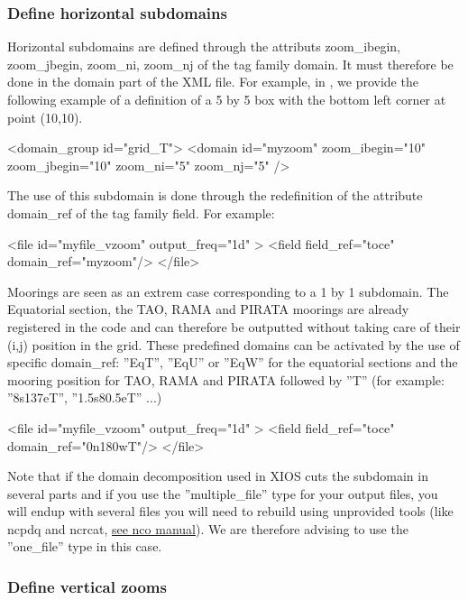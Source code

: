 \documentclass[../main/NEMO_manual]{subfiles}
\begin{document}
\subsubsection{Define horizontal subdomains}

Horizontal subdomains are defined through the attributs zoom\_ibegin, zoom\_jbegin, zoom\_ni, zoom\_nj of
the tag family domain.
It must therefore be done in the domain part of the XML file. 
For example, in , we provide the following example of a definition of 
a 5 by 5 box with the bottom left corner at point (10,10).

\begin{xmllines}
<domain_group id="grid_T">
	<domain id="myzoom" zoom_ibegin="10" zoom_jbegin="10" zoom_ni="5" zoom_nj="5" />
\end{xmllines}

The use of this subdomain is done through the redefinition of the attribute domain\_ref of the tag family field.
For example:

\begin{xmllines}
<file id="myfile_vzoom" output_freq="1d" >
	<field field_ref="toce" domain_ref="myzoom"/>
</file>
\end{xmllines}

Moorings are seen as an extrem case corresponding to a 1 by 1 subdomain. 
The Equatorial section, the TAO, RAMA and PIRATA moorings are already registered in the code and
can therefore be outputted without taking care of their (i,j) position in the grid.
These predefined domains can be activated by the use of specific domain\_ref:
''EqT'', ''EqU'' or ''EqW'' for the equatorial sections and
the mooring position for TAO, RAMA and PIRATA followed by ''T'' (for example: ''8s137eT'', ''1.5s80.5eT'' ...)

\begin{xmllines}
<file id="myfile_vzoom" output_freq="1d" >
	<field field_ref="toce" domain_ref="0n180wT"/>
</file>
\end{xmllines}

Note that if the domain decomposition used in XIOS cuts the subdomain in several parts and if 
you use the ''multiple\_file'' type for your output files, 
you will endup with several files you will need to rebuild using unprovided tools (like ncpdq and ncrcat, 
\href{http://nco.sourceforge.net/nco.html#Concatenation}{see nco manual}).
We are therefore advising to use the ''one\_file'' type in this case.

\subsubsection{Define vertical zooms}
\end{document}
